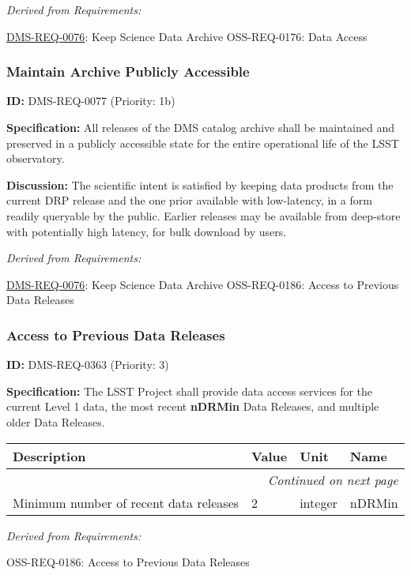 \documentclass[SE,toc,lsstdraft]{lsstdoc}
\makeatletter
\newcommand{\paramname}[1]{\hspace{0pt}#1}
\newcommand{\unitname}[1]{\hspace{0pt}#1}
\newenvironment{parameters}[0]{%
\setlength\LTleft{0pt}
\setlength\LTright{\fill}
\begin{small}
\begin{longtable}[]{|p{0.49\textwidth}|l|p{0.6in}|p{1.70in}@{}|}

\hline \textbf{Description} & \textbf{Value} & \textbf{Unit} & \textbf{Name} \\ \hline
\endhead

\hline \multicolumn{4}{r}{\emph{Continued on next page}} \\
\endfoot

\hline\hline
\endlastfoot
}{%
\hline
\end{longtable}
\end{small}
}
\makeatother
\begin{document}
\emph{Derived from Requirements:}

\hyperref[DMS-REQ-0076]{DMS-REQ-0076}:
Keep Science Data Archive \newline
OSS-REQ-0176:
Data Access \newline

\subsubsection{Maintain Archive Publicly Accessible}

\label{DMS-REQ-0077}
\textbf{ID:} DMS-REQ-0077 (Priority: 1b)

\textbf{Specification: }All releases of the DMS catalog archive shall be maintained and preserved in a publicly accessible state for the entire operational life of the LSST observatory.

\textbf{Discussion:} The scientific intent is satisfied by keeping data products from the current DRP release and the one prior available with low-latency, in a form readily queryable by the public. Earlier releases may be available from deep-store with potentially high latency, for bulk download by users.

\emph{Derived from Requirements:}

\hyperref[DMS-REQ-0076]{DMS-REQ-0076}:
Keep Science Data Archive \newline
OSS-REQ-0186:
Access to Previous Data Releases \newline

\subsubsection{Access to Previous Data Releases}

\label{DMS-REQ-0363}
\textbf{ID:} DMS-REQ-0363 (Priority: 3)

\textbf{Specification:}
The LSST Project shall provide data access services for the current Level 1 data, the most recent \textbf{nDRMin} Data Releases, and multiple older Data Releases.

\begin{parameters}
Minimum number of recent data releases
&
2
&
\unitname{%
integer
}
&
\paramname{%
nDRMin
} \\\hline
\end{parameters}

\emph{Derived from Requirements:}

OSS-REQ-0186:
Access to Previous Data Releases \newline
\end{document}
